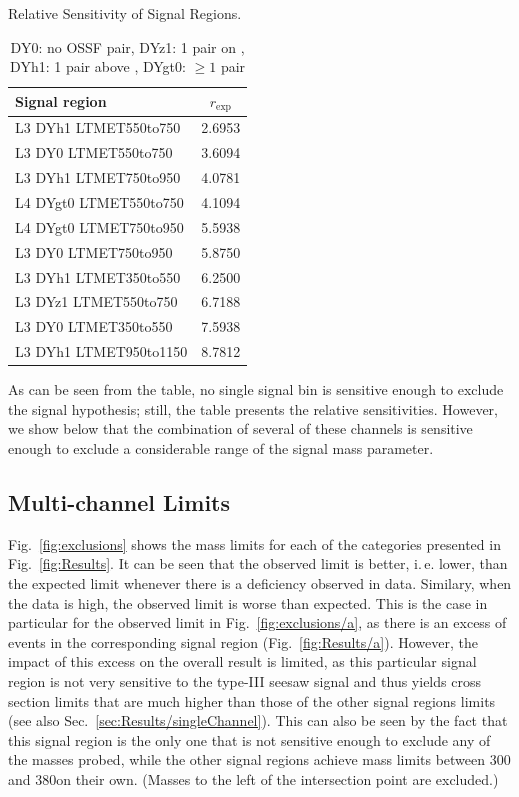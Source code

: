 \begin{table}
\centering
\caption{Relative Sensitivity of Signal Regions.} \label{tab:topSensitivity}
\caption*{DY0: no OSSF pair, DYz1: 1 pair on \Z,\\ DYh1: 1 pair above \Z, DYgt0: $\geq 1$ pair}
\begin{tabular}{l c}
\hline\hline
Signal region & $r_\textrm{exp}$\\
\hline
L3 DYh1 LTMET550to750 & 2.6953\\
L3 DY0 LTMET550to750 & 3.6094\\
L3 DYh1 LTMET750to950 & 4.0781\\
L4 DYgt0 LTMET550to750 & 4.1094\\
L4 DYgt0 LTMET750to950 & 5.5938\\
\hline
L3 DY0 LTMET750to950 & 5.8750\\
L3 DYh1 LTMET350to550 & 6.2500\\
L3 DYz1 LTMET550to750 & 6.7188\\
L3 DY0 LTMET350to550 & 7.5938\\
L3 DYh1 LTMET950to1150 & 8.7812\\
\end{tabular}
\end{table}

As can be seen from the table, no single signal bin is sensitive enough to exclude the signal hypothesis; still, the table presents the relative sensitivities. However, we show below that the combination of several of these channels is sensitive enough to exclude a considerable range of the signal mass parameter.

\subsection{Multi-channel Limits}
Fig.~\ref{fig:exclusions} shows the mass limits for each of the categories presented in Fig.~\ref{fig:Results}. It can be seen that the observed limit is better, i.\,e. lower, than the expected limit whenever there is a deficiency observed in data. Similary, when the data is high, the observed limit is worse than expected. This is the case in particular for the observed limit in Fig.~\ref{fig:exclusions/a}, as there is an excess of events in the corresponding signal region (Fig.~\ref{fig:Results/a}). However, the impact of this excess on the overall result is limited, as this particular signal region is not very sensitive to the type-III seesaw signal and thus yields cross section limits that are much higher than those of the other signal regions limits (see also Sec.~\ref{sec:Results/singleChannel}). This can also be seen by the fact that this signal region is the only one that is not sensitive enough to exclude any of the masses probed, while the other signal regions achieve mass limits between 300 and 380\GeV on their own. (Masses to the left of the intersection point are excluded.)


